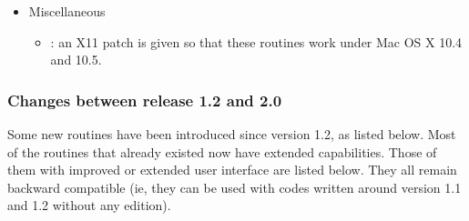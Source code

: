 \documentclass[12pt,twoside]{article}
\begin{document}
{{\begin{itemize}
\begin{itemize}
\begin{itemize}
	page~\pageref{page:plot_example_execute}
\item addition of {\tt ASINH} keyword to allow better visualisation of highly
contrasted maps; see Figure~\ref{fig:merge_wmapKband} on page~\pageref{page:merge_wmapKband},
\item under certain circumstances, can process high resolution cut sky data sets
	without creating full sky dummy maps,
\item accept gzip compressed FITS files,
\item accept polarized cut sky maps,
\item accept multi-dimensional online arrays,
\item more robust {\tt OUTLINE} option.
\end{itemize}

\item {}: bugs correction
\item {}: more robust user interface
\item {}: new {\tt /FORCE} keyword
\item {}: more accurate
\item {}: when the disc center is
located at one of
the poles, {\em only} the pixels overlapping with the disc are now returned.
\end{itemize}
%
\item Miscellaneous
\begin{itemize}
\item {}: an X11 patch is
given so that these routines work under Mac OS X 10.4 and 10.5.
\end{itemize}
\end{itemize}

\subsubsection{Changes between release 1.2 and 2.0}
Some new routines have been introduced since version 1.2, as listed below.
Most of the routines that already existed now have extended
capabilities.
Those of them with improved or extended user interface are listed
below. They all remain backward compatible (ie, they can be used with codes written
around version 1.1 and 1.2 without any edition).

}}
\end{document}
